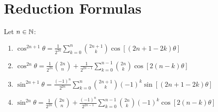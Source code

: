 \documentclass[letterpaper,12pt,fleqn]{article}
\renewcommand{\o}{\theta}
\begin{document}
\section*{Reduction Formulas}
\begin{theorem}
Let $n\in\mathbb{N}$:
\begin{enumerate}
\item $\cos^{2n+1}\o=\frac{1}{2^{2n}}\sum_{k=0}^n\binom{2n+1}{k}\cos[(2n+1-2k)\o]$
\item $\cos^{2n}\o=\frac{1}{2^{2n}}\binom{2n}{n}+
    \frac{1}{2^{2n-1}}\sum_{k=0}^{n-1}\binom{2n}{k}\cos[2(n-k)\o]$
\item $\sin^{2n+1}\o=\frac{(-1)^n}{2^{2n}}
    \sum_{k=0}^n\binom{2n+1}{k}(-1)^k\sin[(2n+1-2k)\o]$
\item $\sin^{2n}\o=\frac{1}{2^{2n}}\binom{2n}{n}+
    \frac{(-1)^n}{2^{2n-1}}\sum_{k=0}^{n-1}\binom{2n}{k}(-1)^k\cos[2(n-k)\o]$
\end{enumerate}
\end{theorem}
\end{document}

